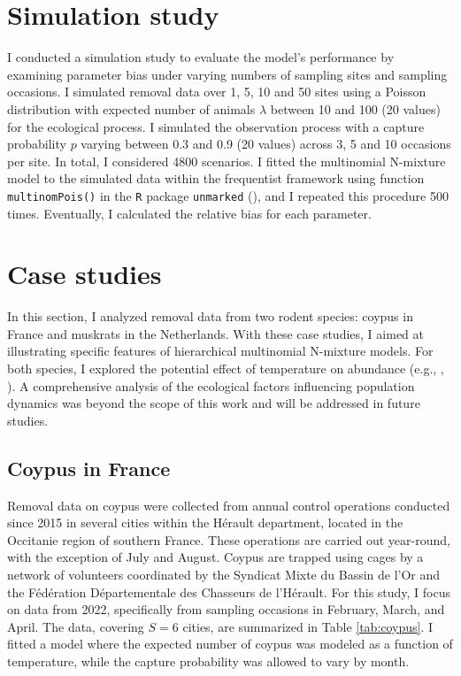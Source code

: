 \documentclass[
  11pt,
  a4paper,
]{article}
\begin{document}
\section{Simulation study}\label{simulation-study}

I conducted a simulation study to evaluate the model's performance by examining parameter bias under varying numbers of sampling sites and sampling occasions. I simulated removal data over 1, 5, 10 and 50 sites using a Poisson distribution with expected number of animals \(\lambda\) between 10 and 100 (20 values) for the ecological process. I simulated the observation process with a capture probability \(p\) varying between 0.3 and 0.9 (20 values) across 3, 5 and 10 occasions per site. In total, I considered 4800 scenarios. I fitted the multinomial N-mixture model to the simulated data within the frequentist framework using function \texttt{multinomPois()} in the \texttt{R} package \texttt{unmarked} (), and I repeated this procedure 500 times. Eventually, I calculated the relative bias for each parameter.

\section{Case studies}\label{case-studies}

In this section, I analyzed removal data from two rodent species: coypus in France and muskrats in the Netherlands. With these case studies, I aimed at illustrating specific features of hierarchical multinomial N-mixture models. For both species, I explored the potential effect of temperature on abundance (e.g., , ). A comprehensive analysis of the ecological factors influencing population dynamics was beyond the scope of this work and will be addressed in future studies.

\subsection{Coypus in France}\label{coypus-in-france}

Removal data on coypus were collected from annual control operations conducted since 2015 in several cities within the Hérault department, located in the Occitanie region of southern France. These operations are carried out year-round, with the exception of July and August. Coypus are trapped using cages by a network of volunteers coordinated by the Syndicat Mixte du Bassin de l'Or and the Fédération Départementale des Chasseurs de l'Hérault. For this study, I focus on data from 2022, specifically from sampling occasions in February, March, and April. The data, covering \(S = 6\) cities, are summarized in Table \ref{tab:coypus}. I fitted a model where the expected number of coypus was modeled as a function of temperature, while the capture probability was allowed to vary by month.
\end{document}
